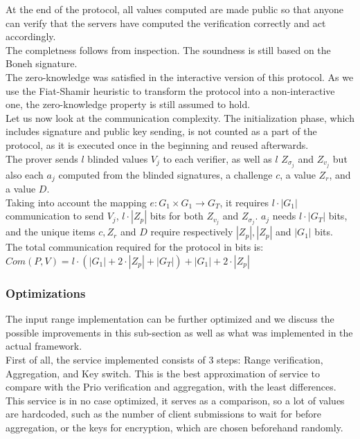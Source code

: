 \documentclass{article}
\begin{document}
At the end of the protocol, all values computed are made public so that anyone can verify that the servers have computed the verification correctly and act accordingly.\\

The completness follows from inspection. The soundness is still based on the Boneh signature.\\
The zero-knowledge was satisfied in the interactive version of this protocol. As we use the Fiat-Shamir heuristic \cite{fiatshamir} to transform the protocol into a  non-interactive one, the zero-knowledge property is still assumed to hold.\\

Let us now look at the communication complexity.
The initialization phase, which includes signature and public key sending, is not counted as a part of the protocol, as it is executed once in the beginning and reused afterwards.\\
The prover sends $l$ blinded values $V_j$ to each verifier, as well as $l$ $Z_{\sigma_j}$ and $Z_{v_j}$ but also each $a_j$ computed from the blinded signatures, a challenge $c$, a value $Z_r$, and a value $D$.\\
Taking into account the mapping $e : G_1 \times G_1 \rightarrow G_T$, it requires $l \cdot |G_1|$ communication to send $V_j$, $l \cdot |Z_p|$ bits for both $Z_{v_j}$ and $Z_{\sigma_j}$. $a_j$  needs $l \cdot |G_T|$ bits, and the unique items $c,Z_r $ and $D$ require respectively $ |Z_p|, |Z_p| $ and $|G_1|$ bits.\\
The total communication required for the protocol in bits is:\\
$Com(P,V) = l \cdot (|G_1| + 2 \cdot |Z_p| + |G_T|) + |G_1| + 2 \cdot |Z_p|$


\subsubsection*{Optimizations}
The input range implementation can be further optimized and we discuss the possible improvements in this sub-section as well as what was implemented in the actual framework.\\
First of all, the service implemented consists of 3 steps: Range verification, Aggregation, and Key switch. This is the best approximation of service to compare with the Prio verification and aggregation, with the least differences.\\
This service is in no case optimized, it serves as a comparison, so a lot of values are hardcoded, such as the number of client submissions to wait for before aggregation, or the keys for encryption, which are chosen beforehand randomly.\\
\end{document}
